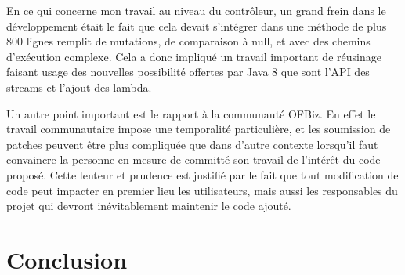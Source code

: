 \documentclass[a4paper, 11pt]{report}
\begin{document}
En ce qui concerne mon travail au niveau du contrôleur, un grand frein
dans le développement était le fait que cela devait s'intégrer dans
une méthode de plus 800 lignes remplit de mutations, de comparaison à
null, et avec des chemins d'exécution complexe. Cela a donc impliqué
un travail important de réusinage faisant usage des nouvelles
possibilité offertes par Java 8 que sont l'API des streams et l'ajout
des lambda.

Un autre point important est le rapport à la communauté OFBiz.  En
effet le travail communautaire impose une temporalité particulière, et
les soumission de patches peuvent être plus compliquée que dans
d'autre contexte lorsqu'il faut convaincre la personne en mesure de
committé son travail de l'intérêt du code proposé.  Cette lenteur et
prudence est justifié par le fait que tout modification de code peut
impacter en premier lieu les utilisateurs, mais aussi les responsables
du projet qui devront inévitablement maintenir le code ajouté.

\chapter{Conclusion}

\clearpage



\end{document}
